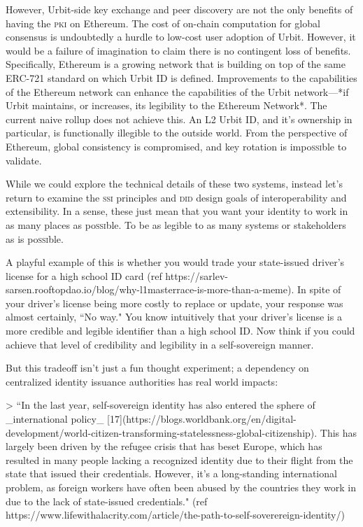 \documentclass[twoside]{article}
\begin{document}
However, Urbit-side key exchange and peer discovery are not the only benefits of having the \textsc{pki} on Ethereum. The cost of on-chain computation for global consensus is undoubtedly a hurdle to low-cost user adoption of Urbit. However, it would be a failure of imagination to claim there is no contingent loss of benefits. Specifically, Ethereum is a growing network that is building on top of the same ERC-721 standard on which Urbit ID is defined. Improvements to the capabilities of the Ethereum network can enhance the capabilities of the Urbit network—*if Urbit maintains, or increases, its legibility to the Ethereum Network*.  The current naive rollup does not achieve this. An L2 Urbit ID, and it's ownership in particular, is functionally illegible to the outside world. From the perspective of Ethereum, global consistency is compromised, and key rotation is impo\textsc{ssi}ble to validate. 

While we could explore the technical details of these two systems, instead let's return to examine the \textsc{ssi} principles and \textsc{did} design goals of interoperability and extensibility. In a sense, these just mean that you want your identity to work in as many places as po\textsc{ssi}ble. To be as legible to as many systems or stakeholders as is po\textsc{ssi}ble. 

A playful example of this is whether you would trade your state-issued driver's license for a high school ID card (ref https://sarlev-sarsen.rooftopdao.io/blog/why-l1masterrace-is-more-than-a-meme). In spite of your driver's license being more costly to replace or update, your response was almost certainly, ``No way." You know intuitively that your driver's license is a more credible and legible identifier than a high school ID. Now think if you could achieve that level of credibility and legibility in a self-sovereign manner.

But this tradeoff isn't just a fun thought experiment; a dependency on centralized identity issuance authorities has real world impacts:

> ``In the last year, self-sovereign identity has also entered the sphere of _international policy_ [17](https://blogs.worldbank.org/en/digital-development/world-citizen-transforming-statelessness-global-citizenship). This has largely been driven by the refugee crisis that has beset Europe, which has resulted in many people lacking a recognized identity due to their flight from the state that issued their credentials. However, it’s a long-standing international problem, as foreign workers have often been abused by the countries they work in due to the lack of state-issued credentials." (ref https://www.lifewithalacrity.com/article/the-path-to-self-soverereign-identity/)
\end{document}
